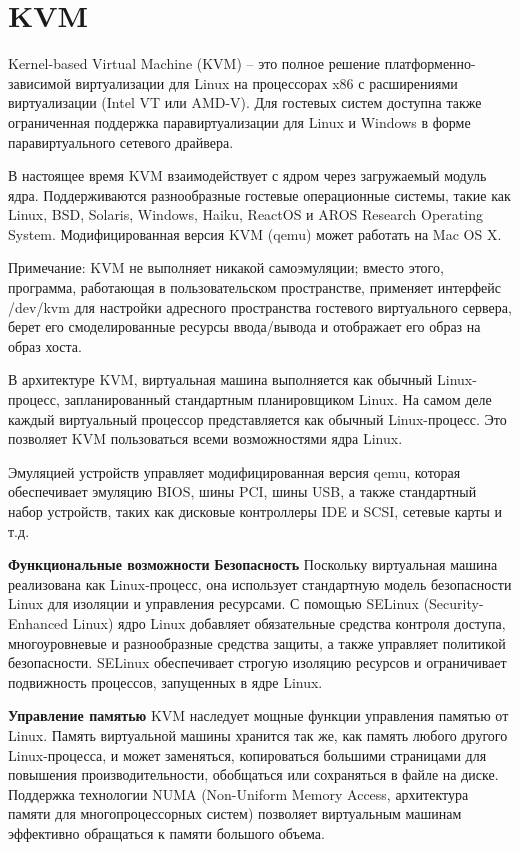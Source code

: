 \section{KVM}\label{sec:ch3/sect4}
Kernel-based Virtual Machine (KVM) – это полное решение платформенно-зависимой виртуализации для Linux на процессорах x86 с расширениями виртуализации (Intel VT или AMD-V). Для гостевых систем доступна также ограниченная поддержка паравиртуализации для Linux и Windows в форме паравиртуального сетевого драйвера.

В настоящее время KVM взаимодействует с ядром через загружаемый модуль ядра. Поддерживаются разнообразные гостевые операционные системы, такие как Linux, BSD, Solaris, Windows, Haiku, ReactOS и AROS Research Operating System. Модифицированная версия KVM (qemu) может работать на Mac OS X.

Примечание: KVM не выполняет никакой самоэмуляции; вместо этого, программа, работающая в пользовательском пространстве, применяет интерфейс /dev/kvm для настройки адресного пространства гостевого виртуального сервера, берет его смоделированные ресурсы ввода/вывода и отображает его образ на образ хоста.

В архитектуре KVM, виртуальная машина выполняется как обычный Linux-процесс, запланированный стандартным планировщиком Linux. На самом деле каждый виртуальный процессор представляется как обычный Linux-процесс. Это позволяет KVM пользоваться всеми возможностями ядра Linux.

Эмуляцией устройств управляет модифицированная версия qemu, которая обеспечивает эмуляцию BIOS, шины PCI, шины USB, а также стандартный набор устройств, таких как дисковые контроллеры IDE и SCSI, сетевые карты и т.д.

\textbf{Функциональные возможности}
\textbf{Безопасность}
Поскольку виртуальная машина реализована как Linux-процесс, она использует стандартную модель безопасности Linux для изоляции и управления ресурсами. С помощью SELinux (Security-Enhanced Linux) ядро Linux добавляет обязательные средства контроля доступа, многоуровневые и разнообразные средства защиты, а также управляет политикой безопасности. SELinux обеспечивает строгую изоляцию ресурсов и ограничивает подвижность процессов, запущенных в ядре Linux.

\textbf{Управление памятью}
KVM наследует мощные функции управления памятью от Linux. Память виртуальной машины хранится так же, как память любого другого Linux-процесса, и может заменяться, копироваться большими страницами для повышения производительности, обобщаться или сохраняться в файле на диске. Поддержка технологии NUMA (Non-Uniform Memory Access, архитектура памяти для многопроцессорных систем) позволяет виртуальным машинам эффективно обращаться к памяти большого объема.


